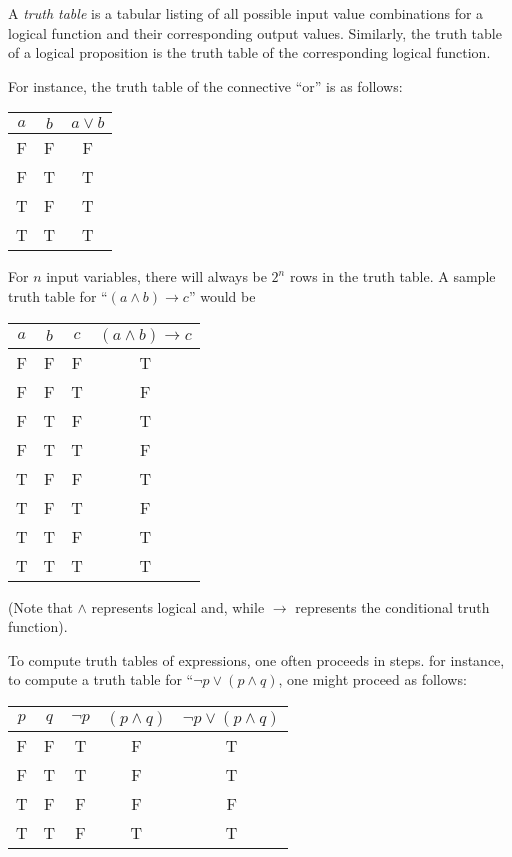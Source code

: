 \documentclass{article}
\begin{document}
A \emph{truth table} is a tabular listing of all possible input value combinations for a logical function and their corresponding output values.  Similarly, the truth table of a logical proposition is the truth table of the corresponding logical function. 

For instance, the truth table of the connective ``or'' is as follows:
\begin{center}
\begin{tabular}{ccc}
$a$ & $b$ & $a \lor b$ \\
\hline 
F & F & F \\
F & T & T \\
T & F & T \\
T & T & T 
\end{tabular}
\end{center}

For $n$ input variables, there will always be $2^n$ rows in the truth table.  
A sample truth table for ``$(a \land b) \rightarrow c$'' would be

\begin{center}
\begin{tabular}{cccc}
$a$ & $b$ & $c$ & $(a \land b) \rightarrow c$ \\
\hline 
F & F & F & T \\
F & F & T & F \\
F & T & F & T \\
F & T & T & F \\
T & F & F & T \\
T & F & T & F \\
T & T & F & T \\
T & T & T & T 
\end{tabular}
\end{center}

(Note that $\land$ represents logical and, while $\rightarrow$ represents the conditional truth function).

To compute truth tables of expressions, one often proceeds in steps.  for instance, 
to compute a truth table for ``$\neg p \lor (p \land q)$, one might proceed as follows:

\begin{center}
\begin{tabular}{ccccc}
$p$ & $q$ & $\neg p$ & $(p \land q)$ & $\neg p \lor (p \land q)$ \\
\hline 
F & F & T & F & T \\
F & T & T & F & T \\
T & F & F & F & F \\
T & T & F & T & T
\end{tabular}
\end{center}
\end{document}
